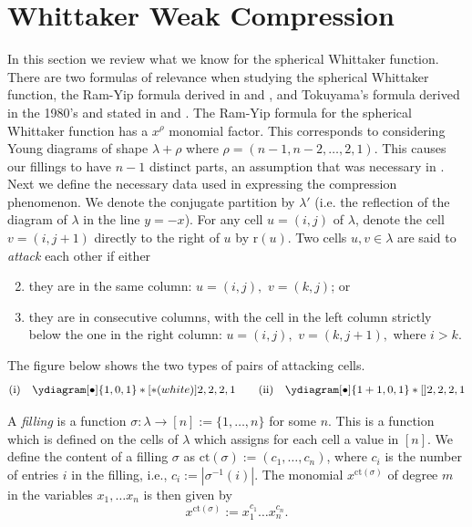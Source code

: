 \documentclass[11pt]{amsart}
\begin{document}
{\section{Whittaker Weak Compression}
In this section we review what we know for the spherical Whittaker function. There are two formulas of relevance when studying the spherical Whittaker function, the Ram-Yip formula derived in \cite{BBL} and \cite{OS}, and Tokuyama's formula derived in the 1980's and stated in \cite{G} and \cite[Chapter V]{BBF}. The Ram-Yip formula for the spherical Whittaker function has a $x^{\rho}$ monomial factor. This corresponds to considering Young diagrams of shape $\lambda+\rho$ where $\rho=(n-1,n-2,\ldots,2,1)$. This causes our fillings to have $n-1$ distinct parts, an assumption that was necessary in \cite{CL1}.
\newline\indent Next we define the necessary data used in expressing the compression phenomenon. We denote the conjugate partition by $\lambda'$ (i.e. the reflection of the diagram of $\lambda$ in the line $y=-x$). For any cell $u=(i,j)$ of $\lambda$, denote the cell $v=(i,j+1)$ directly to the right of $u$ by $\textrm{r}(u)$.
\newline\indent Two cells $u,v \in \lambda$ are said to \emph{attack} each other if either
\begin{enumerate}\setcounter{enumiii}{1}
\item they are in the same column: $u=(i,j),$ $v=(k,j)$; or
\item they are in consecutive columns, with the cell in the left column strictly below the one in the right column: $u=(i,j),$ $v=(k,j+1),$ where $i>k$.
\end{enumerate}

The figure below shows the two types of pairs of attacking cells.
\begin{equation*}
\textrm{(i)\quad} \ydiagram[\bullet]{1,0,1}*[*(white)]{2,2,2,1} \textrm{\quad \quad}
\textrm{(ii)\quad} \ydiagram[\bullet]{1+1,0,1}*[]{2,2,2,1}
\end{equation*}

\indent A \emph{filling} is a function $\sigma:\lambda \rightarrow [n]:=\{1,\ldots, n\}$ for some $n$. This is a function which is defined on the cells of $\lambda$ which assigns for each cell a value in $[n]$. We define the content of a filling $\sigma$ as $\textrm{ct}(\sigma):=(c_{1}, \ldots, c_{n})$, where $c_{i}$ is the number of entries $i$ in the filling, i.e., $c_{i}:=|\sigma^{-1}(i)|.$ The monomial $x^{\textrm{ct}(\sigma)}$ of degree $m$ in the variables $x_{1},\ldots x_{n}$ is then given by $$x^{\textrm{ct}(\sigma)}:=x_{1}^{c_{1}}\ldots x_{n}^{c_{n}}.$$

}
\end{document}
